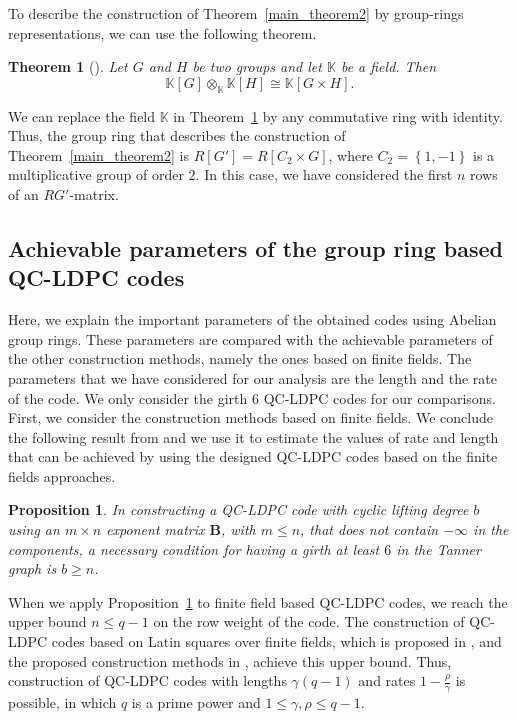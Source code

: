 \documentclass[journal,draftclsnofoot,onecolumn,12pt,twoside]{IEEEtran}
\newtheorem{Proposition}{Proposition}
\newtheorem{theorem}{Theorem}
\begin{document}
To describe the construction of Theorem~\ref{main_theorem2} by group-rings representations, we can use the following theorem.
\begin{theorem}[\emph{\cite[Lemma 3.4]{29}}]\label{passman}
Let $G$ and $H$ be two groups and let $\mathbb{K}$ be a field. Then $$\mathbb{K}[G]\otimes_{\mathbb{K}} \mathbb{K}[H]\cong \mathbb{K}[G\times H].$$
\end{theorem}



We can replace the field $\mathbb{K}$ in Theorem~\ref{passman} by any commutative ring with identity. Thus, the group ring that describes the construction of Theorem~\ref{main_theorem2} is $R[G']=R[C_2\times G]$, where $C_2=\left\{1,-1\right\}$ is a multiplicative group of order $2$. In this case, we have considered the first $n$ rows of an $RG'$-matrix.
\subsection{Achievable parameters of the group ring based QC-LDPC codes}
Here, we explain the important parameters of the obtained codes using Abelian group rings. These parameters are compared with the achievable parameters of the other construction methods, namely the ones based on finite fields. The parameters that we have considered for our analysis are the length and the rate of the code. We only consider the girth $6$ QC-LDPC codes for our comparisons.  First, we consider the construction methods based on finite fields. We conclude the following result from \cite[Corollary 1]{banihashemi} and we use it to estimate the values of rate and length that can be achieved by using the designed QC-LDPC codes based on the finite fields approaches.
\begin{Proposition}\label{prop2}
In constructing a QC-LDPC code with cyclic lifting degree $b$ using an $m\times n$ exponent matrix $\mathbf{B}$, with $m\leq n$, that does not contain $-\infty$ in the components, a necessary condition
for having a girth  at least $6$ in the Tanner graph is $b\geq n$.
\end{Proposition}


When we apply Proposition~\ref{prop2} to  finite field based QC-LDPC codes, we reach  the upper bound $n\leq q-1$ on the row weight of the code. The construction of QC-LDPC codes based on Latin squares over finite fields, which is proposed in \cite{Latin_square}, and the proposed construction methods in \cite{QC_cyclic}, achieve this upper bound. Thus, construction of QC-LDPC codes with lengths $\gamma(q-1)$ and rates $1-\frac{\rho}{\gamma}$ is possible, in which $q$ is a prime power  and $1\leq\gamma,\rho\leq q-1$.
\end{document}
